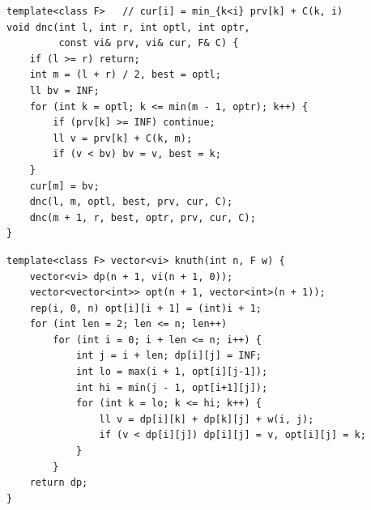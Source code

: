 \begin{lstlisting}
template<class F>   // cur[i] = min_{k<i} prv[k] + C(k, i)
void dnc(int l, int r, int optl, int optr,
         const vi& prv, vi& cur, F& C) {
    if (l >= r) return;
    int m = (l + r) / 2, best = optl;
    ll bv = INF;
    for (int k = optl; k <= min(m - 1, optr); k++) {
        if (prv[k] >= INF) continue;
        ll v = prv[k] + C(k, m);
        if (v < bv) bv = v, best = k;
    }
    cur[m] = bv;
    dnc(l, m, optl, best, prv, cur, C);
    dnc(m + 1, r, best, optr, prv, cur, C);
}
\end{lstlisting}


\begin{lstlisting}
template<class F> vector<vi> knuth(int n, F w) {
    vector<vi> dp(n + 1, vi(n + 1, 0));
    vector<vector<int>> opt(n + 1, vector<int>(n + 1));
    rep(i, 0, n) opt[i][i + 1] = (int)i + 1;
    for (int len = 2; len <= n; len++)
        for (int i = 0; i + len <= n; i++) {
            int j = i + len; dp[i][j] = INF;
            int lo = max(i + 1, opt[i][j-1]);
            int hi = min(j - 1, opt[i+1][j]);
            for (int k = lo; k <= hi; k++) {
                ll v = dp[i][k] + dp[k][j] + w(i, j);
                if (v < dp[i][j]) dp[i][j] = v, opt[i][j] = k;
            }
        }
    return dp;
}
\end{lstlisting}
